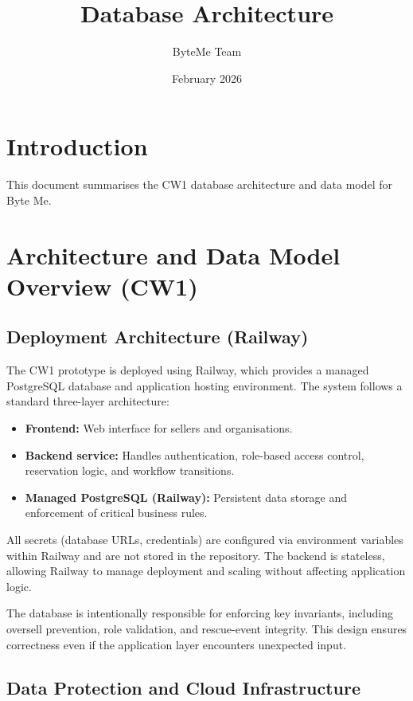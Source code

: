 \documentclass[11pt,a4paper]{article}
\title{Database Architecture}
\author{ByteMe Team}
\date{February 2026}
\begin{document}
\maketitle

\section{Introduction}
This document summarises the CW1 database architecture and data model for Byte Me.
\section{Architecture and Data Model Overview (CW1)}

\subsection{Deployment Architecture (Railway)}

The CW1 prototype is deployed using Railway, which provides a managed PostgreSQL database and application hosting environment. The system follows a standard three-layer architecture:

\begin{itemize}
    \item \textbf{Frontend:} Web interface for sellers and organisations.
    \item \textbf{Backend service:} Handles authentication, role-based access control, reservation logic, and workflow transitions.
    \item \textbf{Managed PostgreSQL (Railway):} Persistent data storage and enforcement of critical business rules.
\end{itemize}

All secrets (database URLs, credentials) are configured via environment variables within Railway and are not stored in the repository. The backend is stateless, allowing Railway to manage deployment and scaling without affecting application logic.

The database is intentionally responsible for enforcing key invariants, including oversell prevention, role validation, and rescue-event integrity. This design ensures correctness even if the application layer encounters unexpected input.

\subsection{Data Protection and Cloud Infrastructure}
\end{document}
